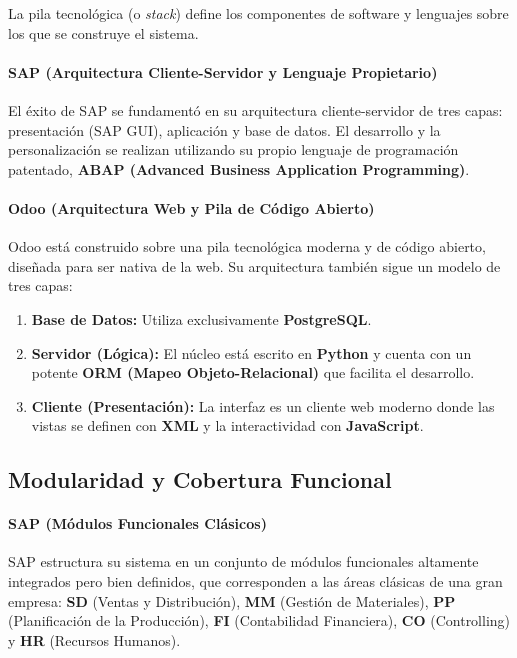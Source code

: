 \documentclass[12pt,letterpaper,spanish]{report}
\begin{document}
La pila tecnológica (o \textit{stack}) define los componentes de software y lenguajes sobre los que se construye el sistema.

\paragraph{SAP (Arquitectura Cliente-Servidor y Lenguaje Propietario)}
El éxito de SAP se fundamentó en su arquitectura cliente-servidor de tres capas: presentación (SAP GUI), aplicación y base de datos. El desarrollo y la personalización se realizan utilizando su propio lenguaje de programación patentado, \textbf{ABAP (Advanced Business Application Programming)}.

\paragraph{Odoo (Arquitectura Web y Pila de Código Abierto)}
Odoo está construido sobre una pila tecnológica moderna y de código abierto, diseñada para ser nativa de la web. Su arquitectura también sigue un modelo de tres capas:
\begin{enumerate}
    \item \textbf{Base de Datos:} Utiliza exclusivamente \textbf{PostgreSQL}.
    \item \textbf{Servidor (Lógica):} El núcleo está escrito en \textbf{Python} y cuenta con un potente \textbf{ORM (Mapeo Objeto-Relacional)} que facilita el desarrollo.
    \item \textbf{Cliente (Presentación):} La interfaz es un cliente web moderno donde las vistas se definen con \textbf{XML} y la interactividad con \textbf{JavaScript}.
\end{enumerate}

\subsection{Modularidad y Cobertura Funcional}

\paragraph{SAP (Módulos Funcionales Clásicos)}
SAP estructura su sistema en un conjunto de módulos funcionales altamente integrados pero bien definidos, que corresponden a las áreas clásicas de una gran empresa: \textbf{SD} (Ventas y Distribución), \textbf{MM} (Gestión de Materiales), \textbf{PP} (Planificación de la Producción), \textbf{FI} (Contabilidad Financiera), \textbf{CO} (Controlling) y \textbf{HR} (Recursos Humanos).
\end{document}
